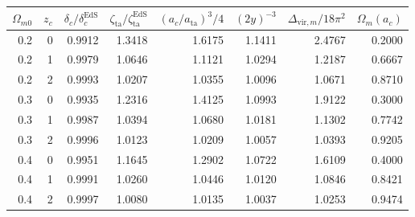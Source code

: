 \begin{tabular}{rrrrrrrr}
\toprule
$\Omega_{m0}$ & $z_c$ & $\delta_c/\delta_c^\mathrm{EdS}$ & $\zeta_\mathrm{ta}/\zeta^\mathrm{EdS}_\mathrm{ta}$ & $(a_c/a_\mathrm{ta})^3/4$ & $(2y)^{-3}$ & $\Delta_{\mathrm{vir},m}/18\pi^2$ & $\Omega_m(a_c)$ \\
\midrule
0.2 & 0 & 0.9912 & 1.3418 & 1.6175 & 1.1411 & 2.4767 & 0.2000 \\
0.2 & 1 & 0.9979 & 1.0646 & 1.1121 & 1.0294 & 1.2187 & 0.6667 \\
0.2 & 2 & 0.9993 & 1.0207 & 1.0355 & 1.0096 & 1.0671 & 0.8710 \\
0.3 & 0 & 0.9935 & 1.2316 & 1.4125 & 1.0993 & 1.9122 & 0.3000 \\
0.3 & 1 & 0.9987 & 1.0394 & 1.0680 & 1.0181 & 1.1302 & 0.7742 \\
0.3 & 2 & 0.9996 & 1.0123 & 1.0209 & 1.0057 & 1.0393 & 0.9205 \\
0.4 & 0 & 0.9951 & 1.1645 & 1.2902 & 1.0722 & 1.6109 & 0.4000 \\
0.4 & 1 & 0.9991 & 1.0260 & 1.0446 & 1.0120 & 1.0846 & 0.8421 \\
0.4 & 2 & 0.9997 & 1.0080 & 1.0135 & 1.0037 & 1.0253 & 0.9474 \\
\bottomrule
\end{tabular}
